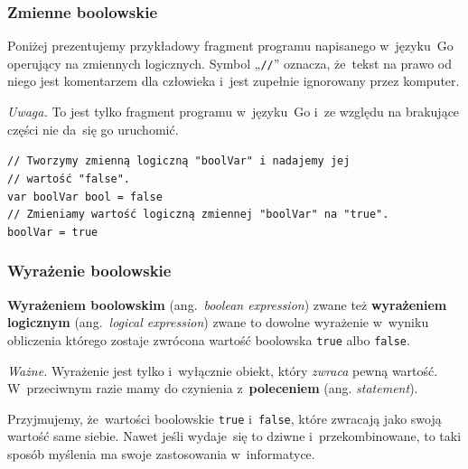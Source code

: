 \documentclass[10pt,t]{beamer}
\begin{document}
\begin{frame}
  \frametitle{Zmienne boolowskie}


  Poniżej prezentujemy przykładowy fragment programu napisanego w~języku~Go
  operujący na zmiennych logicznych. Symbol „\texttt{//}” oznacza, że~tekst
  na prawo od niego jest komentarzem dla człowieka i~jest zupełnie
  ignorowany przez komputer.

  \textit{Uwaga.} To jest tylko fragment programu w~języku~Go i~ze względu
  na brakujące części nie da~się go uruchomić.

  \texttt{// Tworzymy zmienną logiczną "boolVar" i~nadajemy jej} \\
  \texttt{// wartość "false".} \\
  \texttt{var boolVar bool = false} \\
  \vspace{0.8em}
  \texttt{// Zmieniamy wartość logiczną zmiennej "boolVar" na "true".} \\
  \texttt{boolVar = true}

\end{frame}





\begin{frame}
  \frametitle{Wyrażenie boolowskie}


  \textbf{Wyrażeniem boolowskim} (ang.~\textit{boolean expression}) zwane
  też \textbf{wyrażeniem logicznym} (ang.~\textit{logical expression})
  zwane  to dowolne wyrażenie w~wyniku obliczenia którego zostaje zwrócona
  wartość boolowska \texttt{true} albo \texttt{false}.

  \textit{Ważne.} Wyrażenie jest tylko i~wyłącznie obiekt, który
  \textit{zwraca} pewną wartość. W~przeciwnym razie mamy do czynienia
  z~\textbf{poleceniem} (ang. \textit{statement}).

  Przyjmujemy, że~wartości boolowskie \texttt{true} i~\texttt{false}, które
  zwracają jako swoją wartość same siebie. Nawet jeśli wydaje~się to dziwne
  i~przekombinowane, to taki sposób myślenia ma swoje zastosowania
  w~informatyce.

\end{frame}
\end{document}
